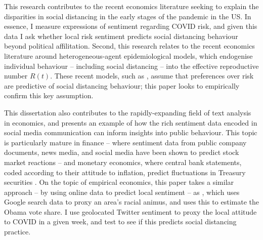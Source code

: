 \documentclass{article}
\begin{document}

This research contributes to the recent economics literature seeking to explain the disparities in social distancing in the early stages of the pandemic in the US.  In essence, I measure expressions of sentiment regarding COVID risk, and given this data I ask whether local risk sentiment predicts social distancing behaviour beyond political affilitation. Second, this research relates to the recent economics literature around heterogeneous-agent epidemiological models, which endogenise individual behaviour -- including social distancing -- into the effective reproductive number \(R(t)\). These recent models, such as \textcite{acemogluTestingVoluntarySocial2020,brotherhoodEconomicModelCOVID192020,eichenbaumMacroeconomicsEpidemics2020}, assume that preferences over risk are predictive of social distancing behaviour; this paper looks to empirically confirm this key assumption.

This dissertation also contributes to the rapidly-expanding field of text analysis in economics, and presents an example of how the rich sentiment data encoded in social media communication can inform insights into public behaviour. This topic is particularly mature in finance -- where sentiment data from public company documents, news media, and social media have been shown to predict stock market reactions \parencite{bollenTwitterMoodPredicts2011} -- and monetary economics, where central bank statements, coded according to their attitude to inflation, predict fluctuations in Treasury securities \parencite{luccaMeasuringCentralBank2009,gentzkowTextData2019}. On the topic of empirical economics, this paper takes a similar approach -- by using online data to predict local sentiment -- as \textcite{stephens-davidowitzCostRacialAnimus2014}, which uses Google search data to proxy an area's racial animus, and uses this to estimate the Obama vote share. I use geolocated Twitter sentiment to proxy the local attitude to COVID in a given week, and test to see if this predicts social distancing practice. 
\end{document}
